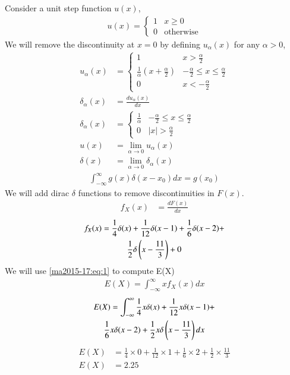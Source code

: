 
Consider a unit step function $u(x)$,
\begin{align}
u(x) = 
    \begin{cases}
        1 & x \geq 0 \\
        0 & \text{otherwise}
    \end{cases}
\end{align}
We will remove the discontinuity at $x=0$ by defining $u_{\alpha}(x)$ for any $\alpha > 0$,
\begin{align}
u_{\alpha}(x) &= 
    \begin{cases}
        1 & x > \frac{\alpha}{2} \\
        \frac{1}{\alpha}(x + \frac{\alpha}{2}) & -\frac{\alpha}{2} \leq x \leq \frac{\alpha}{2} \\
        0 & x < -\frac{\alpha}{2}
    \end{cases}\\
\delta_{\alpha}(x) &= \frac{du_{\alpha}(x)}{dx}\\
\delta_{\alpha}(x) &=
    \begin{cases}
        \frac{1}{\alpha} & -\frac{\alpha}{2} \leq x \leq \frac{\alpha}{2} \\
        0 & |x| > \frac{\alpha}{2}
    \end{cases}\\
u(x) &= \lim_{\alpha \to 0} u_{\alpha}(x)\\
\delta (x) &= \lim_{\alpha \to 0} \delta_{\alpha}(x)
\end{align}
\begin{align}
    \int_{-\infty}^{\infty}g(x)\delta(x-x_0)dx = g(x_0) \label{ma2015-17:eq:1}
\end{align}
We will add dirac $\delta$ functions to remove discontinuities in $F(x)$.
\begin{align}
    f_{X}(x) &= \frac{dF(x)}{dx}
\end{align}
\begin{multline}
    f_{X}(x) = \frac{1}{4}\delta(x) + \frac{1}{12}\delta(x - 1) + \frac{1}{6}\delta(x-2) +\\ \frac{1}{2}\delta\left(x-\frac{11}{3}\right) + 0
\end{multline}
We will use \eqref{ma2015-17:eq:1} to compute E(X)
\begin{align}
    E(X) = \int_{-\infty}^{\infty}xf_X(x)dx
\end{align}
\begin{multline}
    E(X) = \int_{-\infty}^{\infty}\frac{1}{4}x\delta(x) + \frac{1}{12}x\delta(x - 1) +\\ \frac{1}{6}x\delta(x-2) + \frac{1}{2}x\delta\left(x-\frac{11}{3}\right)dx
\end{multline}
\begin{align}
    E(X) &= {\frac{1}{4}}\times 0 + {\frac{1}{12}}\times 1 + {\frac{1}{6}}\times 2 + {\frac{1}{2}}\times{\frac{11}{3}}\\
    E(X) &= 2.25
\end{align}